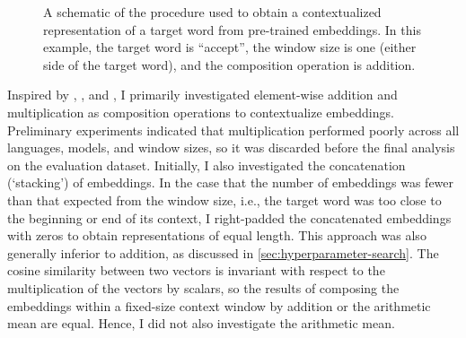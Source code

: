 \begin{figure}
  \centering
  \newcommand*{\orawidest}{accept}
  \newcommand*{\oratallest}{\#\#}
  \newlength{\orawidth}
  \settowidth{\orawidth}{\orawidest}
  \newcommand*{\ora}[1]{\overrightarrow{#1\vphantom{\oratallest}}}
  \caption{A schematic of the procedure used to
    obtain a contextualized representation of a target word from pre-trained embeddings.
    In this example, the target word is ``accept'', the window size is one (either side of
    the target word), and the composition operation is addition.
  }
  \label{chart:schematic-procedure}
\end{figure}

Inspired by \textcites{Landauer1997}, \textcites{Kintsch2001}, and
\textcites{Mitchell2008}, I primarily investigated element-wise addition and
multiplication as composition operations to contextualize embeddings.
Preliminary experiments indicated that multiplication performed poorly across all
languages, models, and window sizes, so it was discarded before the final analysis on
the evaluation dataset.
Initially, I also investigated the concatenation (`stacking') of embeddings.
In the case that the number of embeddings was fewer than that expected from the window
size, i.e., the target word was too close to the beginning or end of its context, I
right-padded the concatenated embeddings with zeros to obtain representations of equal
length.
This approach was also generally inferior to addition, as discussed in
\cref{sec:hyperparameter-search}.
The cosine similarity between two vectors is invariant with respect to the
multiplication of the vectors by scalars, so the results of composing the embeddings
within a fixed-size context window by addition or the arithmetic mean are equal.
Hence, I did not also investigate the arithmetic mean.

